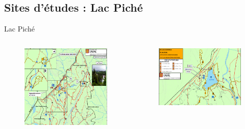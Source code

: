 \documentclass[german,12pt]{beamer}
\begin{document}
\subsection{Sites d'études : Lac Piché}
\begin{frame}{Lac Piché}
\begin{columns}
\begin{figure}
\includegraphics[scale=0.5]{FM.PNG}
\end{figure}
\begin{figure}
\includegraphics[scale=0.5]{LP.PNG}
\end{figure}
\end{columns}
\end{frame}
\end{document}
